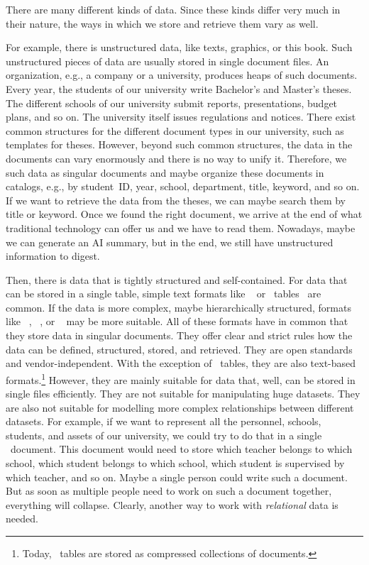 \hsection{}%
%
%
There are many different kinds of data.%
Since these kinds differ very much in their nature, the ways in which we store and retrieve them vary as well.

For example, there is unstructured data, like texts, graphics, or this book.
Such unstructured pieces of data are usually stored in single document files.
An organization, e.g., a company or a university, produces heaps of such documents.
Every year, the students of our university write Bachelor's and Master's theses.
The different schools of our university submit reports, presentations, budget plans, and so on.
The university itself issues regulations and notices.
There exist common structures for the different document types in our university, such as templates for theses.
However, beyond such common structures, the data in the documents can vary enormously and there is no way to unify it.
Therefore, we  such data as singular documents and maybe organize these documents in catalogs, e.g., by student~ID, year, school, department, title, keyword, and so on.
If we want to retrieve the data from the theses, we can maybe search them by title or keyword.
Once we found the right document, we arrive at the end of what traditional technology can offer us and we have to read them.
Nowadays, maybe we can generate an AI summary, but in the end, we still have unstructured information to digest.

Then, there is data that is tightly structured and self-contained.
For data that can be stored in a single table, simple text formats like ~\cite{RFC4180} or \microsoftExcel\ tables~\cite{B2023DMWME,G2024ECRFMME} are common.
If the data is more complex, maybe hierarchically structured, formats like ~\cite{BPSMM2008EMLX1FE,K2019ITXJY,CH2013XFCAMLTMC}, ~\cite{E2017SE4TJDIS,RFC8259}, or ~\cite{DNMAASBE2021YAMLYV1,K2019ITXJY,CGTYB2022YFFDCAIE} may be more suitable.
All of these formats have in common that they store data in singular documents.
They offer clear and strict rules how the data can be defined, structured, stored, and retrieved.
They are open standards and vendor-independent.
With the exception of \microsoftExcel\ tables, they are also text-based formats.\footnote{%
Today, \microsoftExcel\ tables are stored as compressed collections of  documents.%
} %
However, they are mainly suitable for data that, well, can be stored in single files efficiently.
They are not suitable for manipulating huge datasets.
They are also not suitable for modelling more complex relationships between different datasets.
For example, if we want to represent all the personnel, schools, students, and assets of our university, we could try to do that in a single ~document.
This document would need to store which teacher belongs to which school, which student belongs to which school, which student is supervised by which teacher, and so on.
Maybe a single person could write such a document.
But as soon as multiple people need to work on such a document together, everything will collapse.
Clearly, another way to work with \emph{relational} data is needed.

